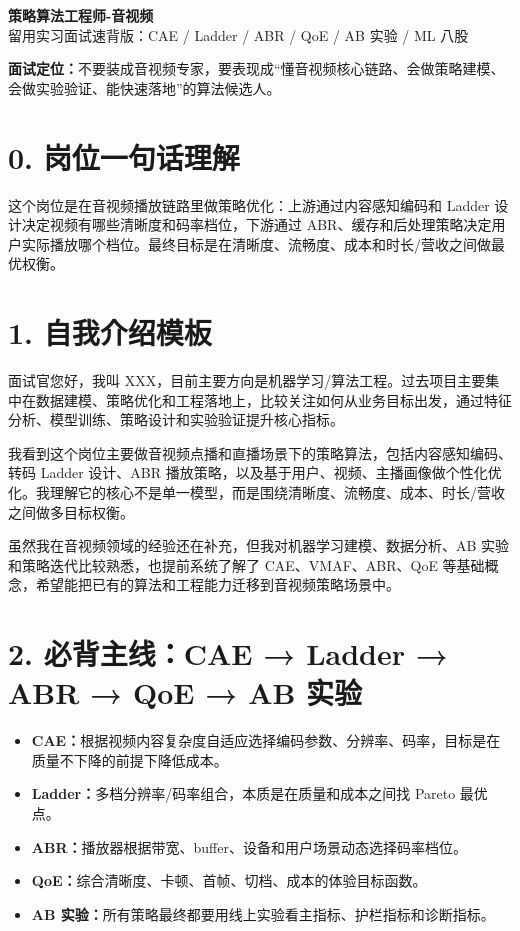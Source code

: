 ﻿\documentclass[11pt,a4paper]{ctexart}
\newcommand{\keybox}[1]{\begin{answerbox}#1\end{answerbox}}
\begin{document}
\begin{center}
{\Huge \bfseries 策略算法工程师-音视频}\\[0.4em]
{\large 留用实习面试速背版：CAE / Ladder / ABR / QoE / AB 实验 / ML 八股}
\end{center}

\keybox{\textbf{面试定位：}不要装成音视频专家，要表现成“懂音视频核心链路、会做策略建模、会做实验验证、能快速落地”的算法候选人。}

\section{0. 岗位一句话理解}
\keybox{这个岗位是在音视频播放链路里做策略优化：上游通过内容感知编码和 Ladder 设计决定视频有哪些清晰度和码率档位，下游通过 ABR、缓存和后处理策略决定用户实际播放哪个档位。最终目标是在清晰度、流畅度、成本和时长/营收之间做最优权衡。}

\section{1. 自我介绍模板}
\keybox{面试官您好，我叫 XXX，目前主要方向是机器学习/算法工程。过去项目主要集中在数据建模、策略优化和工程落地上，比较关注如何从业务目标出发，通过特征分析、模型训练、策略设计和实验验证提升核心指标。

我看到这个岗位主要做音视频点播和直播场景下的策略算法，包括内容感知编码、转码 Ladder 设计、ABR 播放策略，以及基于用户、视频、主播画像做个性化优化。我理解它的核心不是单一模型，而是围绕清晰度、流畅度、成本、时长/营收之间做多目标权衡。

虽然我在音视频领域的经验还在补充，但我对机器学习建模、数据分析、AB 实验和策略迭代比较熟悉，也提前系统了解了 CAE、VMAF、ABR、QoE 等基础概念，希望能把已有的算法和工程能力迁移到音视频策略场景中。}

\section{2. 必背主线：CAE → Ladder → ABR → QoE → AB 实验}
\begin{itemize}
  \item \textbf{CAE：}根据视频内容复杂度自适应选择编码参数、分辨率、码率，目标是在质量不下降的前提下降低成本。
  \item \textbf{Ladder：}多档分辨率/码率组合，本质是在质量和成本之间找 Pareto 最优点。
  \item \textbf{ABR：}播放器根据带宽、buffer、设备和用户场景动态选择码率档位。
  \item \textbf{QoE：}综合清晰度、卡顿、首帧、切档、成本的体验目标函数。
  \item \textbf{AB 实验：}所有策略最终都要用线上实验看主指标、护栏指标和诊断指标。
\end{itemize}
\end{document}
